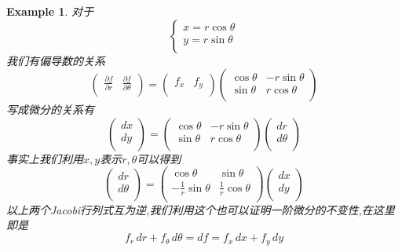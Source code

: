 \documentclass[11pt,hyperref,a4paper,UTF8]{ctexart}
\newtheorem{example}{Example}[subsection]
\begin{document}
\begin{CJK}{UTF8}{gkai}
\begin{example}
  对于
  \[\begin{cases}
    x = r \cos \theta\\
    y = r \sin \theta\\
  \end{cases}\]
  我们有偏导数的关系
  \[\begin{pmatrix}
    \frac{\partial f}{\partial r}&\frac{\partial f}{\partial \theta}\\
  \end{pmatrix} = \begin{pmatrix}
    f_x&f_y\\
  \end{pmatrix} \begin{pmatrix}
    \cos \theta & - r\sin \theta\\
    \sin \theta & r \cos \theta\\
  \end{pmatrix}\]
  写成微分的关系有
  \[\begin{pmatrix}
    dx\\
    dy\\
  \end{pmatrix} = \begin{pmatrix}
    \cos \theta & - r\sin \theta\\
    \sin \theta & r \cos \theta\\
  \end{pmatrix} \begin{pmatrix}
    dr \\
    d\theta\\
  \end{pmatrix}\]
  事实上我们利用$x,y$表示$r,\theta$可以得到
  \[\begin{pmatrix}
    dr \\
    d\theta\\
  \end{pmatrix}= \begin{pmatrix}
    \cos \theta & \sin \theta\\
    -\frac{1}{r}\sin \theta & \frac{1}{r} \cos \theta\\
  \end{pmatrix} \begin{pmatrix}
    dx\\
    dy\\
  \end{pmatrix} \]  
  以上两个Jacobi行列式互为逆,我们利用这个也可以证明一阶微分的不变性,在这里即是
  \[f_r \, dr + f_\theta\, d\theta = df = f_x \, dx + f_y \, dy\]
\end{example}


\end{CJK}
\end{document}
